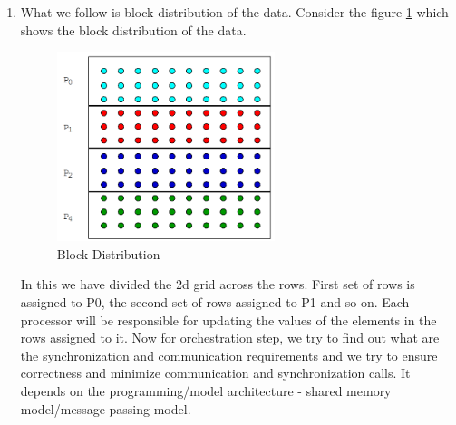 \documentclass[12pt]{book}
\begin{document}
\begin{enumerate}
\item What we follow is block distribution of the data. Consider the figure \ref{fig:block} which shows the block distribution of the data.
\begin{figure}[H]
    \centering
    \includegraphics[width=0.6\textwidth]{images/block.png}
    \caption{Block Distribution}
    \label{fig:block}
\end{figure}
In this we have divided the 2d grid across the rows. First set of rows is assigned to P0, the second set of rows assigned to P1 and so on. Each processor will be responsible 
for updating the values of the elements in the rows assigned to it. Now for orchestration step, we try to find out what are the synchronization and communication requirements and we try to ensure correctness and minimize communication and synchronization calls.
It depends on the programming/model architecture - shared memory model/message passing model. 
\end{enumerate}
\end{document}
